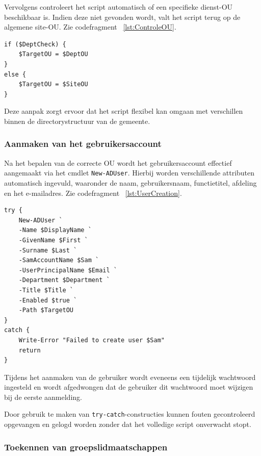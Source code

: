 Vervolgens controleert het script automatisch of een specifieke dienst-OU beschikbaar is. Indien deze niet gevonden wordt, valt het script terug op de algemene site-OU. Zie codefragment ~\ref{lst:ControleOU}.

\begin{listing}[ht]
\begin{verbatim}
if ($DeptCheck) {
    $TargetOU = $DeptOU
}
else {
    $TargetOU = $SiteOU
}
\end{verbatim}
\caption{Controle van de OU}
\label{lst:ControleOU}
\end{listing}

Deze aanpak zorgt ervoor dat het script flexibel kan omgaan met verschillen binnen de directorystructuur van de gemeente.

\subsubsection{Aanmaken van het gebruikersaccount}

Na het bepalen van de correcte OU wordt het gebruikersaccount effectief aangemaakt via het cmdlet \texttt{New-ADUser}. Hierbij worden verschillende attributen automatisch ingevuld, waaronder de naam, gebruikersnaam, functietitel, afdeling en het e-mailadres. Zie codefragment ~\ref{lst:UserCreation}.

\begin{listing}[ht]
\begin{verbatim}
try {
    New-ADUser `
    -Name $DisplayName `
    -GivenName $First `
    -Surname $Last `
    -SamAccountName $Sam `
    -UserPrincipalName $Email `
    -Department $Department `
    -Title $Title `
    -Enabled $true `
    -Path $TargetOU
}
catch {
    Write-Error "Failed to create user $Sam"
    return
}
\end{verbatim}
\caption{Creatie van de gebruiker}
\label{lst:UserCreation}
\end{listing}

Tijdens het aanmaken van de gebruiker wordt eveneens een tijdelijk wachtwoord ingesteld en wordt afgedwongen dat de gebruiker dit wachtwoord moet wijzigen bij de eerste aanmelding.

Door gebruik te maken van \texttt{try-catch}-constructies kunnen fouten gecontroleerd opgevangen en gelogd worden zonder dat het volledige script onverwacht stopt.

\subsubsection{Toekennen van groepslidmaatschappen}

